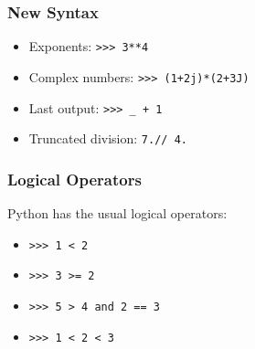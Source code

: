 \documentclass[red]{beamer}
\begin{document}
\begin{frame}[fragile]
    \frametitle{New Syntax}
    
    \begin{itemize}
        \item Exponents: \lstinline|>>> 3**4| \\
        \item Complex numbers: \lstinline|>>> (1+2j)*(2+3J)| \\
        \item Last output: \lstinline|>>> _ + 1| \\
        \item Truncated division: \lstinline|7.// 4.| \\
    \end{itemize}
\end{frame}
\begin{frame}[fragile]
    \frametitle{Logical Operators}

    Python has the usual logical operators:
    \begin{itemize}
        \item \lstinline|>>> 1 < 2|\\
        \item \lstinline|>>> 3 >= 2|\\
        \item \lstinline|>>> 5 > 4 and 2 == 3|\\
        \item \lstinline|>>> 1 < 2 < 3|\\
    \end{itemize}
    
    \begin{block}
    \end{block}
\end{frame}
\end{document}
